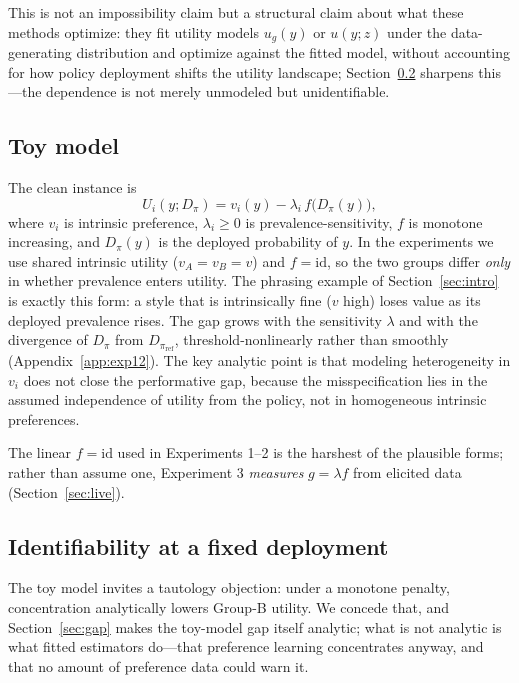 ﻿\documentclass[11pt]{article}
\begin{document}
This is not an impossibility claim but a structural claim about what these methods optimize: they fit utility models \(u_g(y)\) or \(u(y; z)\) under the data-generating distribution and optimize against the fitted model, without accounting for how policy deployment shifts the utility landscape; Section~\ref{sec:identifiability} sharpens this---the dependence is not merely unmodeled but unidentifiable.

\subsection{Toy model}
\label{sec:toy}

The clean instance is
\[U_i(y; D_\pi) = v_i(y) - \lambda_i \, f\big(D_\pi(y)\big),\]
where \(v_i\) is intrinsic preference, \(\lambda_i \geq 0\) is prevalence-sensitivity, \(f\) is monotone increasing, and \(D_\pi(y)\) is the deployed probability of \(y\). In the experiments we use shared intrinsic utility (\(v_A = v_B = v\)) and \(f = \mathrm{id}\), so the two groups differ \emph{only} in whether prevalence enters utility. The phrasing example of Section~\ref{sec:intro} is exactly this form: a style that is intrinsically fine (\(v\) high) loses value as its deployed prevalence rises. The gap grows with the sensitivity \(\lambda\) and with the divergence of \(D_\pi\) from \(D_{\pi_{\text{ref}}}\), threshold-nonlinearly rather than smoothly (Appendix~\ref{app:exp12}). The key analytic point is that modeling heterogeneity in \(v_i\) does not close the performative gap, because the misspecification lies in the assumed independence of utility from the policy, not in homogeneous intrinsic preferences.

The linear \(f = \mathrm{id}\) used in Experiments 1--2 is the harshest of the plausible forms; rather than assume one, Experiment 3 \emph{measures} \(g = \lambda f\) from elicited data (Section~\ref{sec:live}).

\subsection{Identifiability at a fixed deployment}
\label{sec:identifiability}

The toy model invites a tautology objection: under a monotone penalty, concentration analytically lowers Group-B utility. We concede that, and Section~\ref{sec:gap} makes the toy-model gap itself analytic; what is not analytic is what fitted estimators do---that preference learning concentrates anyway, and that no amount of preference data could warn it.
\end{document}
